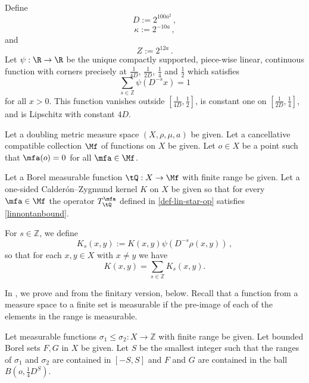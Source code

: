 Define
\begin{equation}\label{defineD}
    D:= 2^{100 a^2}\, ,
\end{equation}
\begin{equation}\label{definekappa}
    \kappa:= 2^{-10a}\,,
\end{equation}
and
\begin{equation}
    \label{defineZ}
    Z := 2^{12a}\,.
\end{equation}
Let
 $\psi:\R \to \R$ be the unique compactly supported, piece-wise linear, continuous function with corners precisely at $\frac 1{4D}$, $\frac 1{2D}$, $\frac 14$ and $\frac 12$ which satisfies
 \begin{equation}
    \label{eq-psisum}
    \sum_{s\in \mathbb{Z}} \psi(D^{-s}x)=1
\end{equation}
for all $x>0$. This function vanishes outside $[\frac1{4D},\frac 12]$, is constant one on
$[\frac1{2D},\frac 14]$, and is Lipschitz
with constant $4D$.




Let a doubling metric measure space $(X,\rho,\mu, a)$ be given.
Let a cancellative compatible collection $\Mf$ of functions on $X$ be given.
Let $o\in X$ be a point such that $\mfa(o)=0$
for all $\mfa\in \Mf$.


Let a Borel measurable function $\tQ:X\to \Mf$ with finite range be given.
Let a one-sided Calder\'on--Zygmund kernel $K$ on $X$ be given so that for every $\mfa\in \Mf$ the operator $T_{\tQ}^{\mfa}$ defined in \eqref{def-lin-star-op}
satisfies \eqref{linnontanbound}.



For $s\in\mathbb{Z}$, we define
\begin{equation}\label{defks}
    K_s(x,y):=K(x,y)\psi(D^{-s}\rho(x,y))\,,
\end{equation}
so that for each $x, y \in X$ with $x\neq y$ we have
$$K(x,y)=\sum_{s\in\mathbb{Z}}K_s(x,y).$$

In , we prove  and 
from the finitary version,  below. Recall
that a function from a measure space to a finite set is measurable if the pre-image of each of the elements in the range is measurable.


Let measurable functions ${\sigma_1}\leq \sigma_2\colon X\to \mathbb{Z}$ with finite range be given.
Let bounded Borel sets $F,G$ in $X$ be given.
Let $S$ be the smallest integer such that the ranges of
$\sigma_1$ and $\sigma_2$ are contained in $[-S,S]$ and $F$ and $G$ are contained
in the ball $B(o, \frac{1}{4}D^S)$.

